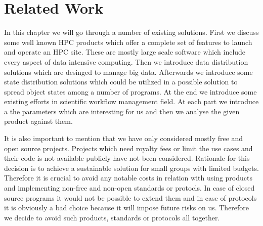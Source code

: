 \chapter{Related Work}
\label{cha:literature}

In this chapter we will go through a number of existing solutions. First we discuss some well known
HPC products which offer a complete set of features to launch and operate an HPC site. These are
mostly large scale software which include every aspect of data intensive computing. 
Then we introduce data distribution solutions which are desinged to manage big data. Afterwards
we introduce some state distribution solutions which could be utilized in a possible solution to
spread object states among a number of programs. At the end we introduce some existing efforts
in scientific workflow management field. At each part we introduce a the parameters which are
interesting for us and then we analyse the given product against them.

It is also important to mention that we have only considered mostly free and open source projects. 
Projects which need royalty fees or limit the use cases and their code is not available
publicly have not been considered. Rationale for this decision is to achieve a 
sustainable solution for small groups with limited budgets. Therefore it is crucial to avoid
any notable costs in relation with using products and implementing non-free and non-open standards or protocls.
In case of closed source programs it would not be possible to extend them and in case of protocols it is
obviously a bad choice because it will impose future risks on us. 
Therefore we decide to avoid such products, standards or protocols all together.




